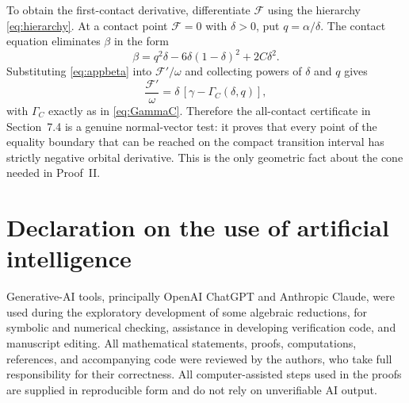 \documentclass{amsart}
\numberwithin{equation}{section}
\theoremstyle{definition}
\theoremstyle{remark}
\newcommand{\Fcal}{\mathcal F}
\begin{document}
To obtain the first-contact derivative, differentiate $\Fcal$ using the hierarchy \eqref{eq:hierarchy}.  At a contact point $\Fcal=0$ with $\delta>0$, put $q=\alpha/\delta$.  The contact equation eliminates $\beta$ in the form
\begin{equation}\label{eq:appbeta}
 \beta=q^2\delta-6\delta(1-\delta)^2+2C\delta^2.
\end{equation}
Substituting \eqref{eq:appbeta} into $\Fcal'/\omega$ and collecting powers of $\delta$ and $q$ gives
\[
 \frac{\Fcal'}{\omega}
 =\delta\,[\gamma-\Gamma_C(\delta,q)],
\]
with $\Gamma_C$ exactly as in \eqref{eq:GammaC}.  Therefore the all-contact certificate in Section~7.4 is a genuine normal-vector test: it proves that every point of the equality boundary that can be reached on the compact transition interval has strictly negative orbital derivative.  This is the only geometric fact about the cone needed in Proof~II.

\section*{Declaration on the use of artificial intelligence}
Generative-AI tools, principally OpenAI ChatGPT and Anthropic Claude, were used during the exploratory development of some algebraic reductions, for symbolic and numerical checking, assistance in developing verification code, and manuscript editing. All mathematical statements, proofs, computations, references, and accompanying code were reviewed by the authors, who take full responsibility for their correctness. All computer-assisted steps used in the proofs are supplied in reproducible form and do not rely on unverifiable AI output.
\end{document}
